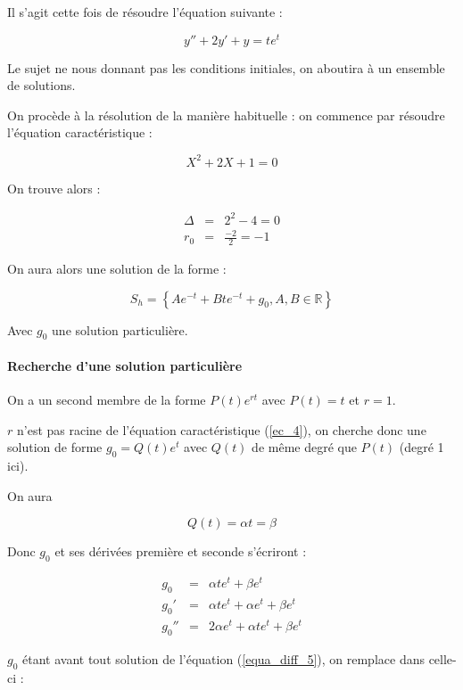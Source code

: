 \documentclass[a4paper, 11pt]{report} %
\newcommand{\R}{\mathbb{R}}
\begin{document}
Il s'agit cette fois de résoudre l'équation suivante :

\begin{equation}
y'' +2y' +y = te^t
\label{equa_diff_5}    
\end{equation}

Le sujet ne nous donnant pas les conditions initiales, on aboutira à un ensemble de solutions.

On procède à la résolution de la manière habituelle : on commence par résoudre l'équation caractéristique :

\begin{equation}
X^2 + 2X + 1 = 0
\label{ec_4}
\end{equation}

On trouve alors :

\begin{eqnarray*}
\Delta & = & 2^2-4 = 0\\
r_0 & = & \frac{-2}{2} = -1
\end{eqnarray*}

On aura alors une solution de la forme :

\[
S_h = \left\{Ae^{-t}+Bte^{-t} + g_0, A,B\in\R\right\}
\]

Avec $g_0$ une solution particulière.

\paragraph{Recherche d'une solution particulière}

On a un second membre de la forme $P(t)e^{rt}$ avec $P(t) = t$ et $r = 1$.

$r$ n'est pas racine de l'équation caractéristique (\ref{ec_4}), on cherche donc une solution de forme $g_0 = Q(t)e^t$
avec $Q(t)$ de même degré que $P(t)$ (degré 1 ici).

On aura

\[ Q(t) = \alpha t = \beta \]

Donc $g_0$ et ses dérivées première et seconde s'écriront :

\begin{eqnarray*}
    g_0 & = & \alpha t e^t + \beta e^t\\
    g_0' & = & \alpha t e^t + \alpha e^t + \beta e^t\\
    g_0'' & = & 2\alpha e^t + \alpha t e^t + \beta e^t
\end{eqnarray*}

$g_0$ étant avant tout solution de l'équation (\ref{equa_diff_5}), on remplace dans celle-ci :
\end{document}

